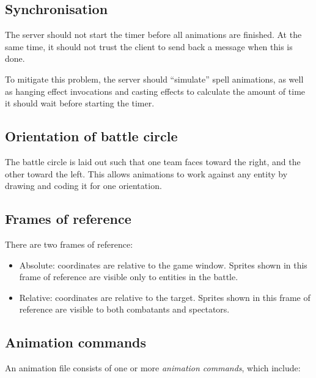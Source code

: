 \documentclass{article}
\begin{document}
\subsection{Synchronisation}

The server should not start the timer before all animations are finished. At the same time, it should not trust the client to send back a message when this is done.

To mitigate this problem, the server should ``simulate'' spell animations, as well as hanging effect invocations and casting effects to calculate the amount of time it should wait before starting the timer.

\subsection{Orientation of battle circle}

The battle circle is laid out such that one team faces toward the right, and the other toward the left. This allows animations to work against any entity by drawing and coding it for one orientation.

\subsection{Frames of reference}

There are two frames of reference:

\begin{itemize}
  \item Absolute: coordinates are relative to the game window. Sprites shown in this frame of reference are visible only to entities in the battle.
  \item Relative: coordinates are relative to the target. Sprites shown in this frame of reference are visible to both combatants and spectators.
\end{itemize}

\subsection{Animation commands}

An animation file consists of one or more \emph{animation commands}, which include:
\end{document}
